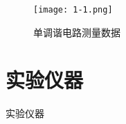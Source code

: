 \documentclass[../main]{subfiles}
\begin{document}
\begin{figure}[htbp]
	\centering
	\texttt{[image: 1-1.png]}
	\caption{单调谐电路测量数据}
	\label{fig:单调谐电路测量数据}
\end{figure}

\section{实验仪器}%
\label{sec:\arabic{chapter}实验仪器}

\begin{table}[htbp]
	\centering
	\caption{实验仪器}
	\label{tab:\arabic{chapter}实验仪器}
\end{table}
\end{document}
